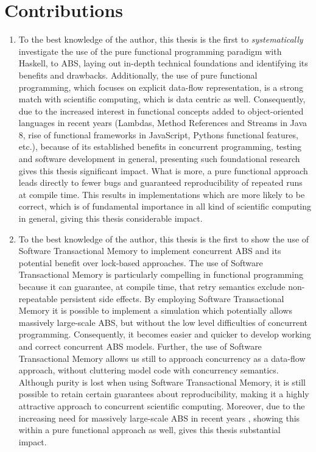 \section{Contributions}
\begin{enumerate}
	\item To the best knowledge of the author, this thesis is the first to \textit{systematically} investigate the use of the pure functional programming paradigm with Haskell, to ABS, laying out in-depth technical foundations and identifying its benefits and drawbacks. Additionally, the use of pure functional programming, which focuses on explicit data-flow representation, is a strong match with scientific computing, which is data centric as well. Consequently, due to the increased interest in functional concepts added to object-oriented languages in recent years (Lambdas, Method References and Streams in Java 8, rise of functional frameworks in JavaScript, Pythons functional features, etc.), because of its established benefits in concurrent programming, testing and software development in general, presenting such foundational research gives this thesis significant impact. What is more, a pure functional approach leads directly to fewer bugs and guaranteed reproducibility of repeated runs at compile time. This results in implementations which are more likely to be correct, which is of fundamental importance in all kind of scientific computing in general, giving this thesis considerable impact.
	
	\item To the best knowledge of the author, this thesis is the first to show the use of Software Transactional Memory to implement concurrent ABS and its potential benefit over lock-based approaches. The use of Software Transactional Memory is particularly compelling in functional programming because it can guarantee, at compile time, that retry semantics exclude non-repeatable persistent side effects. By employing Software Transactional Memory it is possible to implement a simulation which potentially allows massively large-scale ABS, but without the low level difficulties of concurrent programming. Consequently, it becomes easier and quicker to develop working and correct concurrent ABS models. Further, the use of Software Transactional Memory allows us still to approach concurrency as a data-flow approach, without cluttering model code with concurrency semantics. Although purity is lost when using Software Transactional Memory, it is still possible to retain certain guarantees about reproducibility, making it a highly attractive approach to concurrent scientific computing. Moreover, due to the increasing need for massively large-scale ABS in recent years \cite{lysenko_framework_2008}, showing this within a pure functional approach as well, gives this thesis substantial impact.
	

\end{enumerate}
